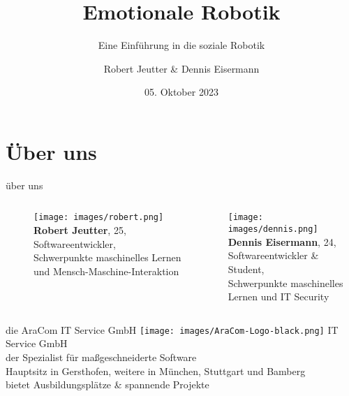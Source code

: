 \documentclass[aspectratio=169]{beamer}
\title{Emotionale Robotik}
\subtitle{Eine Einführung in die soziale Robotik}
\author{Robert Jeutter \& Dennis Eisermann}
\date{05. Oktober 2023}
\begin{document}
\maketitle

\section{Über uns}
\begin{frame}{über uns}
  \begin{columns}
    \begin{column}{0.45\textwidth}
      \begin{figure}[h]
        \centering
        \texttt{[image: images/robert.png]}\\
        \textbf{Robert Jeutter}, 25,\\
        Softwareentwickler,\\
        \scriptsize{Schwerpunkte maschinelles Lernen und Mensch-Maschine-Interaktion}
      \end{figure}
    \end{column}
    \begin{column}{0.45\textwidth}
      \texttt{[image: images/dennis.png]}\\
      \textbf{Dennis Eisermann}, 24,\\
      Softwareentwickler \& Student,\\
      \scriptsize{Schwerpunkte maschinelles Lernen und IT Security}
    \end{column}
  \end{columns}
\end{frame}
\begin{frame}{die AraCom IT Service GmbH}
  \texttt{[image: images/AraCom-Logo-black.png]}
  IT Service GmbH\\
  der Spezialist für maßgeschneiderte Software\\
  Hauptsitz in Gersthofen, weitere in München, Stuttgart und Bamberg\\
  bietet Ausbildungsplätze \& spannende Projekte
\end{frame}
\end{document}
